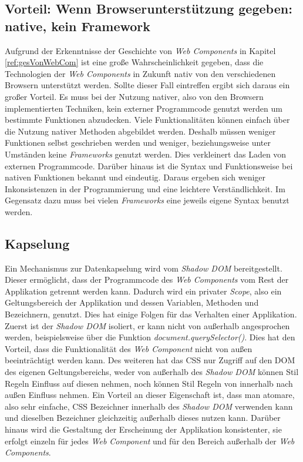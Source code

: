 \documentclass[12pt, paper=a4, bibtotoc, toc=listof, headsepline=true]{scrreprt}
\begin{document}
		\subsection{Vorteil: Wenn Browserunterstützung gegeben: native, kein Framework}
		Aufgrund der Erkenntnisse der Geschichte von \emph{Web Components} in Kapitel \ref{ref:gesVonWebCom} ist eine große Wahrscheinlichkeit gegeben, dass die Technologien der \emph{Web Components} in Zukunft nativ von den verschiedenen Browsern unterstützt werden.
		Sollte dieser Fall eintreffen ergibt sich daraus ein großer Vorteil. Es muss bei der Nutzung nativer, also von den Browsern implementierten Techniken, kein externer Programmcode genutzt werden um bestimmte Funktionen abzudecken. Viele Funktionalitäten können einfach über die Nutzung nativer Methoden abgebildet werden. Deshalb müssen weniger Funktionen selbst geschrieben werden und weniger, beziehungsweise unter Umständen keine \emph{Frameworks} genutzt werden. Dies verkleinert das Laden von externen Programmcode. Darüber hinaus ist die Syntax und Funktionsweise bei nativen Funktionen bekannt und eindeutig. Daraus ergeben sich weniger Inkonsistenzen in der Programmierung und eine leichtere Verständlichkeit. Im Gegensatz dazu muss bei vielen \emph{Frameworks} eine jeweils eigene Syntax benutzt werden.
		\subsection{Kapselung}
		Ein Mechanismus zur Datenkapselung wird vom \emph{Shadow DOM} bereitgestellt.
		Dieser ermöglicht, dass der Programmcode des \emph{Web Components} vom Rest der Applikation getrennt werden kann. Dadurch wird ein privater \emph{Scope}, also ein Geltungsbereich der Applikation und dessen Variablen, Methoden und Bezeichnern, genutzt.\cite[vgl. S.2]{patel2015learning} Dies hat einige Folgen für das Verhalten einer Applikation. Zuerst ist der \emph{Shadow \ac{DOM}} isoliert, er kann nicht von außerhalb angesprochen werden, beispielsweise über die Funktion \emph{document.querySelector()}. Dies hat den Vorteil, dass die Funktionalität des \emph{Web Component} nicht von außen beeinträchtigt werden kann. Des weiteren hat das \ac{CSS} nur Zugriff auf den \ac{DOM} des eigenen Geltungsbereichs, weder von außerhalb des \emph{Shadow \ac{DOM}} können Stil Regeln Einfluss auf diesen nehmen, noch können Stil Regeln von innerhalb nach außen Einfluss nehmen. Ein Vorteil an dieser Eigenschaft ist, dass man atomare, also sehr einfache, \ac{CSS} Bezeichner innerhalb des \emph{Shadow \ac{DOM}} verwenden kann und dieselben Bezeichner gleichzeitig außerhalb dieses nutzen kann.\cite[vgl.]{Bidelman2016} Darüber hinaus wird die Gestaltung der Erscheinung der Applikation konsistenter, sie erfolgt einzeln für jedes \emph{Web Component} und für den Bereich außerhalb der \emph{Web Components}.
\end{document}
